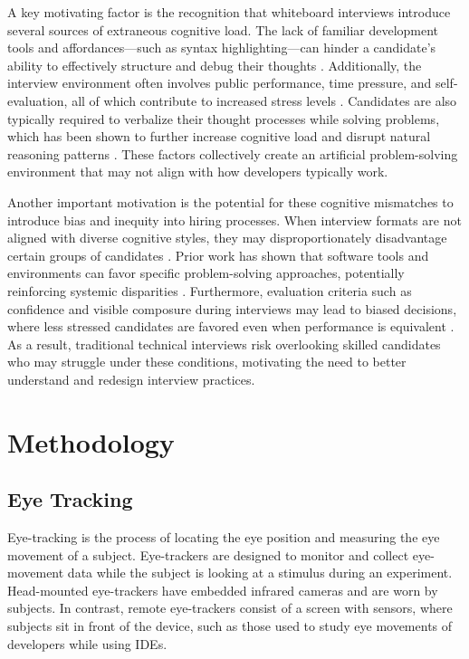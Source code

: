 A key motivating factor is the recognition that whiteboard interviews introduce several sources of extraneous cognitive load. The lack of familiar development tools and affordances—such as syntax highlighting—can hinder a candidate’s ability to effectively structure and debug their thoughts \cite{24_Waestlund2005}. Additionally, the interview environment often involves public performance, time pressure, and self-evaluation, all of which contribute to increased stress levels \cite{11_Klitzman1990WorkSN}. Candidates are also typically required to verbalize their thought processes while solving problems, which has been shown to further increase cognitive load and disrupt natural reasoning patterns \cite{15_Parnin_2010,19_Russo_1989}. These factors collectively create an artificial problem-solving environment that may not align with how developers typically work.

Another important motivation is the potential for these cognitive mismatches to introduce bias and inequity into hiring processes. When interview formats are not aligned with diverse cognitive styles, they may disproportionately disadvantage certain groups of candidates \cite{13_Morris_2015}. Prior work has shown that software tools and environments can favor specific problem-solving approaches, potentially reinforcing systemic disparities \cite{3_Burnett2016}. Furthermore, evaluation criteria such as confidence and visible composure during interviews may lead to biased decisions, where less stressed candidates are favored even when performance is equivalent \cite{8_Ford2017}. As a result, traditional technical interviews risk overlooking skilled candidates who may struggle under these conditions, motivating the need to better understand and redesign interview practices.

\section{Methodology}
\subsection{Eye Tracking}
Eye-tracking is the process of locating the eye position and measuring the eye movement of a subject. Eye-trackers are designed to monitor and collect eye-movement data while the subject is looking at a stimulus during an experiment. Head-mounted eye-trackers have embedded infrared cameras and are worn by subjects. In contrast, remote eye-trackers consist of a screen with sensors, where subjects sit in front of the device, such as those used to study eye movements of developers while using IDEs.

